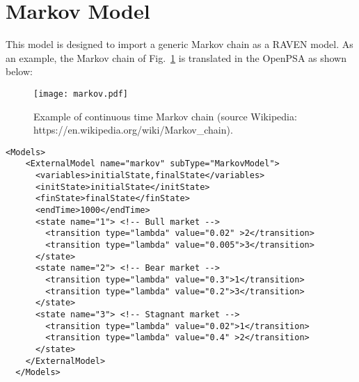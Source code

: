 \section{Markov Model}
\label{sec:MarkovModel}

This model is designed to import a generic Markov chain as a RAVEN model.
As an example, the Markov chain of Fig.~\ref{fig:markov} is translated in the OpenPSA as shown below:

\begin{figure}
    \centering
    \centerline{\texttt{[image: markov.pdf]}}
    \caption{Example of continuous time Markov chain (source Wikipedia: https://en.wikipedia.org/wiki/Markov\_chain).}
    \label{fig:markov}
\end{figure}

\begin{lstlisting}[style=XML,morekeywords={anAttribute},caption=Markov model input example., label=lst:Markov_InputExample]
  <Models>
    <ExternalModel name="markov" subType="MarkovModel">
      <variables>initialState,finalState</variables>
      <initState>initialState</initState>
      <finState>finalState</finState>
      <endTime>1000</endTime>
      <state name="1"> <!-- Bull market -->
        <transition type="lambda" value="0.02" >2</transition>
        <transition type="lambda" value="0.005">3</transition>
      </state>
      <state name="2"> <!-- Bear market -->
        <transition type="lambda" value="0.3">1</transition>
        <transition type="lambda" value="0.2">3</transition>
      </state>
      <state name="3"> <!-- Stagnant market -->
        <transition type="lambda" value="0.02">1</transition>
        <transition type="lambda" value="0.4" >2</transition>
      </state>
    </ExternalModel>
  </Models>
\end{lstlisting}

